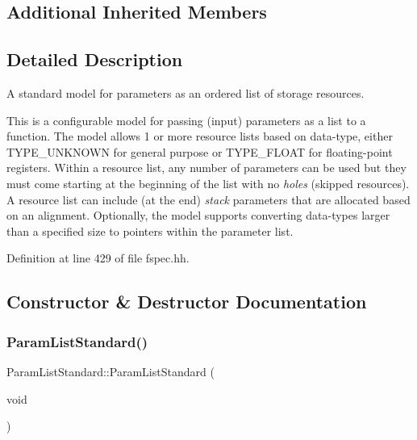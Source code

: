 \subsection*{Additional Inherited Members}


\subsection{Detailed Description}
A standard model for parameters as an ordered list of storage resources. 

This is a configurable model for passing (input) parameters as a list to a function. The model allows 1 or more resource lists based on data-\/type, either T\+Y\+P\+E\+\_\+\+U\+N\+K\+N\+O\+WN for general purpose or T\+Y\+P\+E\+\_\+\+F\+L\+O\+AT for floating-\/point registers. Within a resource list, any number of parameters can be used but they must come starting at the beginning of the list with no {\itshape holes} (skipped resources). A resource list can include (at the end) {\itshape stack} parameters that are allocated based on an alignment. Optionally, the model supports converting data-\/types larger than a specified size to pointers within the parameter list. 

Definition at line 429 of file fspec.\+hh.



\subsection{Constructor \& Destructor Documentation}
\mbox{\label{class_param_list_standard_a78acde89ba28272697adefdf14f13a11}} 
\subsubsection{\texorpdfstring{ParamListStandard()}{ParamListStandard()}\hspace{0.1cm}{\footnotesize\ttfamily [1/2]}}
{\footnotesize\ttfamily Param\+List\+Standard\+::\+Param\+List\+Standard (\begin{DoxyParamCaption}\item[{void}]{ }\end{DoxyParamCaption})\hspace{0.3cm}{\ttfamily [inline]}}



